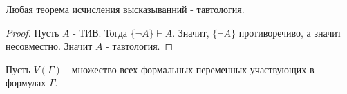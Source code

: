 \begin{consequence} \thmslashn

    Любая теорема исчисления высказыванний - тавтология.
    \begin{proof} \thmslashn
    
        Пусть $A$ - ТИВ. Тогда $\{\neg A\} \vdash A $. Значит, $\{\neg A\}$ противоречиво, а значит несовместно. Значит $A$ - тавтология.
    \end{proof}
\end{consequence}

\begin{definition} \thmslashn 

    Пусть $V(\Gamma)$ - множество всех формальных переменных участвующих в формулах $\Gamma$.
\end{definition}

